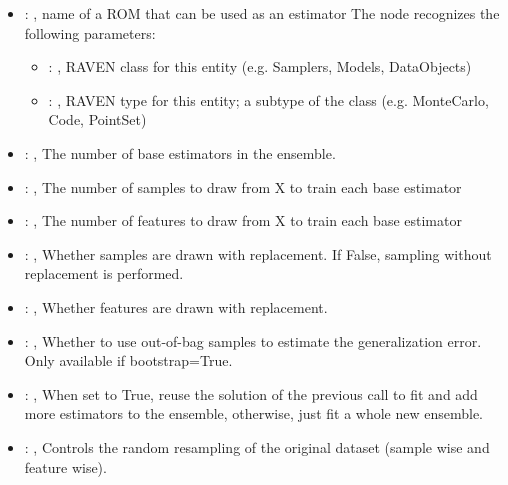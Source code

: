 \begin{itemize}
    \item {}: , 
      name of a ROM that can be used as an estimator
      The  node recognizes the following parameters:
        \begin{itemize}
          \item {}: , 
            RAVEN class for this entity (e.g. Samplers, Models, DataObjects)
          \item {}: , 
            RAVEN type for this entity; a subtype of the class (e.g. MonteCarlo, Code, PointSet)
      \end{itemize}

    \item {}: , 
      The number of base estimators in the ensemble.

    \item {}: , 
      The number of samples to draw from X to train each base estimator

    \item {}: , 
      The number of features to draw from X to train each base estimator

    \item {}: , 
      Whether samples are drawn with replacement. If False, sampling without
      replacement is performed.

    \item {}: , 
      Whether features are drawn with replacement.

    \item {}: , 
      Whether to use out-of-bag samples to estimate the generalization error.
      Only available if bootstrap=True.

    \item {}: , 
      When set to True, reuse the solution of the previous call to fit and add more
      estimators to the ensemble, otherwise, just fit a whole new ensemble.

    \item {}: , 
      Controls the random resampling of the original dataset (sample wise and feature wise).
  \end{itemize}


